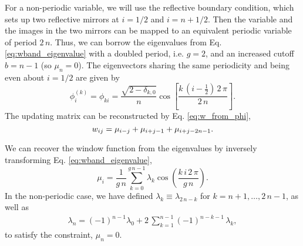 \documentclass[reprint, superscriptaddress, floatfix]{revtex4-1}
\begin{document}
For a non-periodic variable,
we will use the reflective boundary condition\cite{bussi2006},
which sets up two reflective mirrors at
$i = 1/2$ and $i = n + 1/2$.
%
Then the variable and the images in the two mirrors
can be mapped to an equivalent periodic variable of period $2 \, n$.
%
Thus, we can borrow the eigenvalues from
Eq. \eqref{eq:wband_eigenvalue}
with a doubled period, i.e. $g = 2$,
and an increased cutoff $b = n - 1$
(so $\mu_n = 0$).
%
The eigenvectors sharing the same periodicity
and being even about $i = 1/2$ are given by
%
\begin{equation}
  \phi^{(k)}_i
  =
  \phi_{k i}
  =
  \frac{ \sqrt{ 2 - \delta_{k, 0} } }
       {             n              }
  \cos \left[
       \frac{ k \, \left( i - \frac 1 2 \right) \, 2 \, \pi}
            {             2 \, n                           }
       \right]
  .
  \label{eq:wband_eigenvector_refl}
\end{equation}
%
The updating matrix can be reconstructed
by Eq. \eqref{eq:w_from_phi},
%
%
\begin{equation}
  w_{ij}
  =
  \mu_{ i - j }
  +
  \mu_{ i + j - 1 }
  +
  \mu_{ i + j - 2 n - 1 }
  .
  \notag
\end{equation}
%



We can recover the window function from the eigenvalues
by inversely transforming Eq. \eqref{eq:wband_eigenvalue},
%
\begin{equation}
  \mu_i
  =
  \frac { 1 } { g \, n }
  \sum_{ k = 0 }^{ g \, n - 1 }
  \lambda_k
  \cos \left(
       \frac{ k \, i \, 2 \, \pi }
            {      g \, n        }
  \right)
  .
\label{eq:mu_from_lambda}
\end{equation}
%
In the non-periodic case,
we have defined
$\lambda_k \equiv \lambda_{2 \, n - k}$
for $k = n + 1, \dots, 2 \, n - 1$,
as well as
%
\begin{align}
  \lambda_n
  =
  (-1)^{ n - 1 }
  \lambda_0
  +
  2 \, \sum_{ k = 1 }^{ n - 1 }
      (-1)^{n - k - 1} \, \lambda_k
  ,
\label{eq:lambdan}
\end{align}
to satisfy the constraint, $\mu_n = 0$.
%
\end{document}
